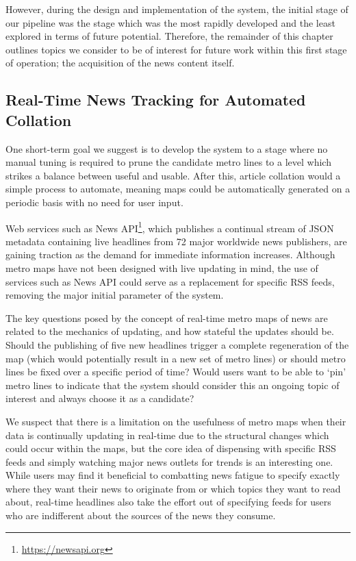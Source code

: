 However, during the design and implementation of the system, the initial stage of our pipeline was the stage which was the most rapidly developed and the least explored in terms of future potential. Therefore, the remainder of this chapter outlines topics we consider to be of interest for future work within this first stage of operation; the acquisition of the news content itself. 

\subsection{Real-Time News Tracking for Automated Collation}

One short-term goal we suggest is to develop the system to a stage where no manual tuning is required to prune the candidate metro lines to a level which strikes a balance between useful and usable. After this, article collation would a simple process to automate, meaning maps could be automatically generated on a periodic basis with no need for user input.

Web services such as News API\footnote{\url{https://newsapi.org}}, which publishes a continual stream of JSON metadata containing live headlines from 72 major worldwide news publishers, are gaining traction as the demand for immediate information increases. Although metro maps have not been designed with live updating in mind, the use of services such as News API could serve as a replacement for specific RSS feeds, removing the major initial parameter of the system.

The key questions posed by the concept of real-time metro maps of news are related to the mechanics of updating, and how stateful the updates should be. Should the publishing of five new headlines trigger a complete regeneration of the map (which would potentially result in a new set of metro lines) or should metro lines be fixed over a specific period of time? Would users want to be able to `pin' metro lines to indicate that the system should consider this an ongoing topic of interest and always choose it as a candidate?

We suspect that there is a limitation on the usefulness of metro maps when their data is continually updating in real-time due to the structural changes which could occur within the maps, but the core idea of dispensing with specific RSS feeds and simply watching major news outlets for trends is an interesting one. While users may find it beneficial to combatting news fatigue to specify exactly where they want their news to originate from or which topics they want to read about, real-time headlines also take the effort out of specifying feeds for users who are indifferent about the sources of the news they consume.

